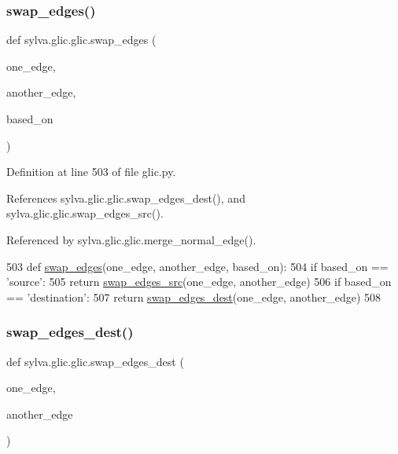 \subsubsection{\texorpdfstring{swap\+\_\+edges()}{swap\_edges()}}
{\footnotesize\ttfamily def sylva.\+glic.\+glic.\+swap\+\_\+edges (\begin{DoxyParamCaption}\item[{}]{one\+\_\+edge,  }\item[{}]{another\+\_\+edge,  }\item[{}]{based\+\_\+on }\end{DoxyParamCaption})}



Definition at line 503 of file glic.\+py.



References sylva.\+glic.\+glic.\+swap\+\_\+edges\+\_\+dest(), and sylva.\+glic.\+glic.\+swap\+\_\+edges\+\_\+src().



Referenced by sylva.\+glic.\+glic.\+merge\+\_\+normal\+\_\+edge().


\begin{DoxyCode}
503     \textcolor{keyword}{def }\hyperlink{namespacesylva_1_1glic_1_1glic_aa33f0fa18db2dc181313352cfdbc0cca}{swap\_edges}(one\_edge, another\_edge, based\_on):
504         \textcolor{keywordflow}{if} based\_on == \textcolor{stringliteral}{'source'}:
505             \textcolor{keywordflow}{return} \hyperlink{namespacesylva_1_1glic_1_1glic_a6e0ff8a8e5ef9956ef0b31be0fb0bf0e}{swap\_edges\_src}(one\_edge, another\_edge)
506         \textcolor{keywordflow}{if} based\_on == \textcolor{stringliteral}{'destination'}:
507             \textcolor{keywordflow}{return} \hyperlink{namespacesylva_1_1glic_1_1glic_a478b14bc177ffdfb87bc422a3e2fa0f1}{swap\_edges\_dest}(one\_edge, another\_edge)
508 
\end{DoxyCode}
\mbox{\label{namespacesylva_1_1glic_1_1glic_a478b14bc177ffdfb87bc422a3e2fa0f1}} 
\subsubsection{\texorpdfstring{swap\+\_\+edges\+\_\+dest()}{swap\_edges\_dest()}}
{\footnotesize\ttfamily def sylva.\+glic.\+glic.\+swap\+\_\+edges\+\_\+dest (\begin{DoxyParamCaption}\item[{}]{one\+\_\+edge,  }\item[{}]{another\+\_\+edge }\end{DoxyParamCaption})}

